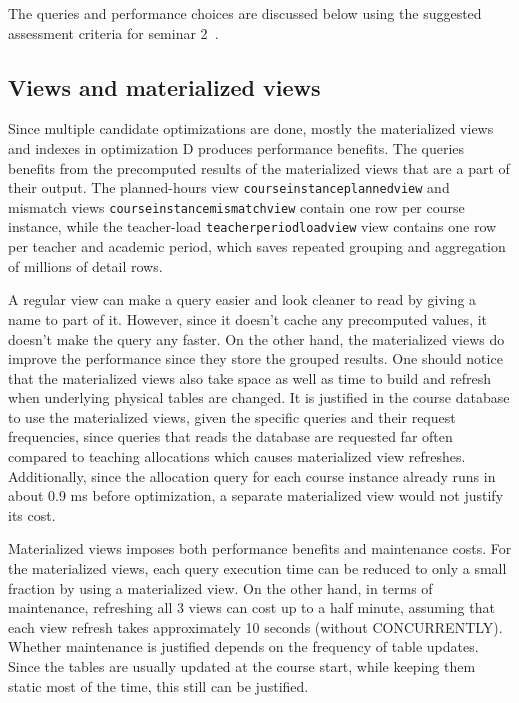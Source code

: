 \documentclass[a4paper]{scrartcl}
\renewcommand{\_}{\textunderscore\allowbreak}
\begin{document}
The queries and performance choices are discussed below using the suggested assessment criteria for seminar 2~\cite{criteria2}.

\subsection{Views and materialized views}

Since multiple candidate optimizations are done, mostly the materialized views and indexes in optimization D produces performance benefits. The queries benefits from the precomputed results of the materialized views that are a part of their output. The planned-hours view \texttt{course\_instance\_planned\_view} and mismatch views \texttt{course\_instance\_mismatch\_view} contain one row per course instance, while the teacher-load \texttt{teacher\_period\_load\_view} view contains one row per teacher and academic period, which saves repeated grouping and aggregation of millions of detail rows.

A regular view can make a query easier and look cleaner to read by giving a name to part of it. However, since it doesn't cache any precomputed values, it doesn't make the query any faster. On the other hand, the materialized views do improve the performance since they store the grouped results. One should notice that the materialized views also take space as well as time to build and refresh when underlying physical tables are changed. It is justified in the course database to use the materialized views, given the specific queries and their request frequencies, since queries that reads the database are requested far often compared to teaching allocations which causes materialized view refreshes. Additionally, since the allocation query for each course instance already runs in about 0.9 ms before optimization, a separate materialized view would not justify its cost.

Materialized views imposes both performance benefits and maintenance costs. For the materialized views, each query execution time can be reduced to only a small fraction by using a materialized view. On the other hand, in terms of maintenance, refreshing all 3 views can cost up to a half minute, assuming that each view refresh takes approximately 10 seconds (without CONCURRENTLY). Whether maintenance is justified depends on the frequency of table updates. Since the tables are usually updated at the course start, while keeping them static most of the time, this still can be justified. 
\end{document}

